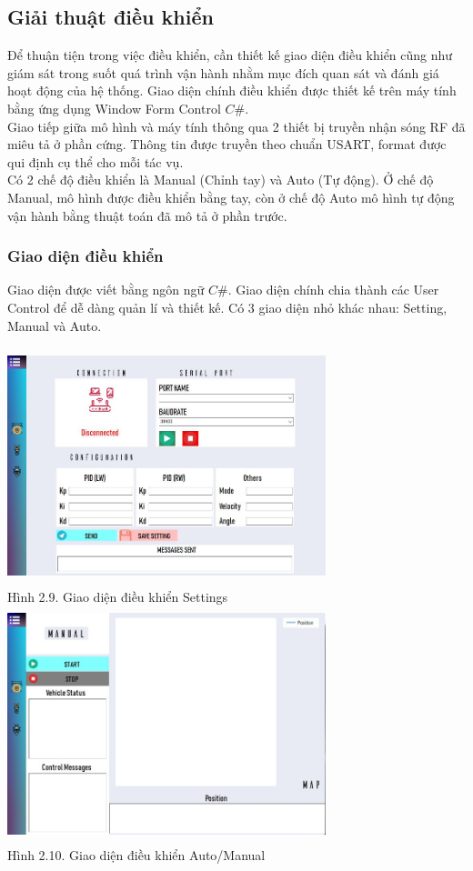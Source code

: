 \documentclass[a4paper, 12pt]{article}
\begin{document}
	\subsection{Giải thuật điều khiển}
	\hspace{0.5cm}
	Để thuận tiện trong việc điều khiển, cần thiết kế giao diện điều khiển cũng như giám sát trong suốt quá trình vận hành nhằm mục đích quan sát và đánh giá hoạt động của hệ thống. Giao diện chính điều khiển được thiết kế trên máy tính bằng ứng dụng Window Form Control $C\#$.\\
	\indent
	Giao tiếp giữa mô hình và máy tính thông qua 2 thiết bị truyền nhận sóng RF đã miêu tả ở phần cứng. Thông tin được truyền theo chuẩn USART, format được qui định cụ thể cho mỗi tác vụ.\\
	\indent
	Có 2 chế độ điều khiển là Manual (Chỉnh tay) và Auto (Tự động). Ở chế độ Manual, mô hình được điều khiển bằng tay, còn ở chế độ Auto mô hình tự động vận hành bằng thuật toán đã mô tả ở phần trước.
	\subsubsection{Giao diện điều khiển}
	Giao diện được viết bằng ngôn ngữ $C\#$. Giao diện chính chia thành các User Control để dễ dàng quản lí và thiết kế. Có 3 giao diện nhỏ khác nhau: Setting, Manual và Auto.
	\hspace{0.5cm}
	\begin{center}
		\includegraphics[width=350px,height=260px]{images/InterfaceSetting}\\
		Hình 2.9. Giao diện điều khiển Settings\\\vspace{0.5cm}
		\includegraphics[width=350px,height=260px]{images/InterfaceManual}\\
		Hình 2.10. Giao diện điều khiển Auto/Manual
	\end{center}
	\newpage
\end{document}
